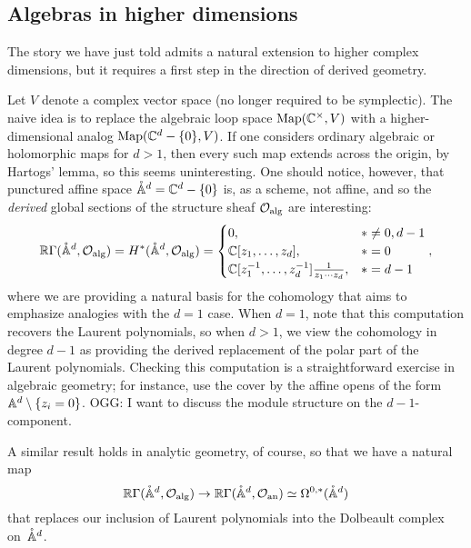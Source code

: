 \documentclass[11pt]{amsart}
\def\pAA{\mathring{\AA}}
\def\owen#1{{\textcolor{green!65!black}{OGG: {#1}}}}
\begin{document}
\subsection{Algebras in higher dimensions }

The story we have just told admits a natural extension to higher complex dimensions,
but it requires a first step in the direction of derived geometry.

Let $V$ denote a complex vector space (no longer required to be symplectic).
The naive idea is to replace the algebraic loop space $\Map(\CC^\times,  V)$ with a higher-dimensional analog $\Map(\CC^d -\{0\}, V)$.
If one considers ordinary algebraic or holomorphic maps for $d > 1$, 
then every such map extends across the origin, by Hartogs' lemma,
so this seems uninteresting.
One should notice, however, that punctured affine space $\mathring{\AA}^d = \CC^d -\{0\}$ is, as a scheme, not affine, 
and so the {\em derived} global sections of the structure sheaf $\cO_{\rm alg}$ are interesting:
\[
\RR \Gamma(\pAA^d, \cO_{\rm alg}) = H^* (\mathring{\AA}^d, \cO_{\rm alg}) 
= \begin{cases} 
0, & * \neq 0, d-1 \\ 
\CC[z_1,\ldots,z_d], & * = 0 \\ 
\CC[z_1^{-1},\ldots,z_d^{-1}] \frac{1}{z_1 \cdots z_d}, & * = d-1 
\end{cases},
\]
where we are providing a natural basis for the cohomology 
that aims to emphasize analogies with the $d=1$ case.
When $d=1$, note that this computation recovers the Laurent polynomials,
so when $d > 1$, 
we view the cohomology in degree $d-1$ as providing the derived replacement of the polar part of the Laurent polynomials.
Checking this computation is a straightforward exercise in algebraic geometry;
for instance, use the cover by the affine opens of the form $\AA^d \setminus \{z_i =0\}$.
\owen{I want to discuss the module structure on the $d-1$-component.}

A similar result holds in analytic geometry, of course,
so that we have a natural map
\[
\RR \Gamma(\pAA^d, \cO_{\rm alg}) \to \RR \Gamma(\pAA^d, \cO_{\rm an}) \simeq \Omega^{0,*}(\pAA^d)
\]
that replaces our inclusion of Laurent polynomials into the Dolbeault complex on~$\pAA^d$.
\end{document}

